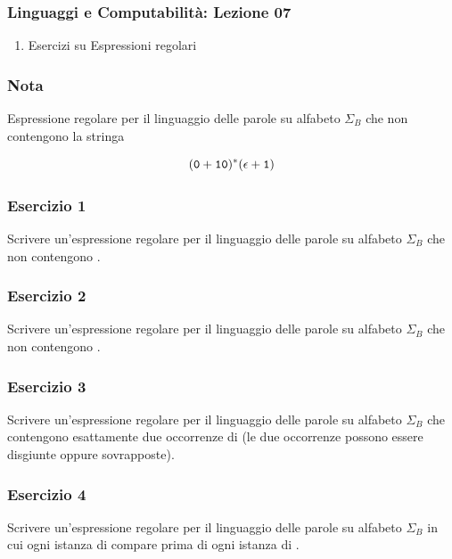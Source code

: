 




\begin{frame}[fragile]
	\frametitle{Linguaggi e Computabilità: Lezione 07}
\begin{enumerate}
\item
Esercizi su Espressioni regolari
\end{enumerate}
\end{frame}

\begin{frame}
\frametitle{Nota}
Espressione regolare per il linguaggio delle parole su alfabeto $\Sigma_{B}$ che non contengono la stringa \uno\uno

\[(\mathtt{0}+\mathtt{1}\mathtt{0}){}^{\ast}(\epsilon+\mathtt{1})\]
\end{frame}


\begin{frame}
\frametitle{Esercizio 1}
Scrivere un'espressione regolare per il linguaggio delle parole su alfabeto $\Sigma_{B}$ che non contengono
\uno\zero\uno.
\end{frame}

\begin{frame}
\frametitle{Esercizio 2}
Scrivere un'espressione regolare per il linguaggio delle parole su alfabeto $\Sigma_{B}$ che non contengono
\uno\uno\zero.
\end{frame}

\begin{frame}
\frametitle{Esercizio 3}
Scrivere un'espressione regolare per il linguaggio delle parole su alfabeto $\Sigma_{B}$ che contengono
esattamente due occorrenze di \zero\zero (le due occorrenze possono essere disgiunte oppure sovrapposte).
\end{frame}


\begin{frame}
\frametitle{Esercizio 4}
Scrivere un'espressione regolare per il linguaggio delle parole su alfabeto $\Sigma_{B}$ in cui ogni istanza di
\zero\zero compare prima di ogni istanza di \uno\uno.
\end{frame}

